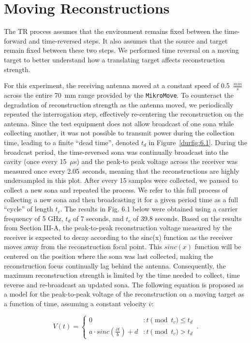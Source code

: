 \section{Moving Reconstructions}
\label{sec:moving}

The TR process assumes that the environment remains fixed between the time-forward and time-reversed steps. It also assumes that the source and target remain fixed between these two steps. We performed time reversal on a moving target to better understand how a translating target affects reconstruction strength.

For this experiment, the receiving antenna moved at a constant speed of 0.5~$\frac{mm}{s}$ across the entire 70~mm range provided by the \texttt{MikroMove}. To counteract the degradation of reconstruction strength as the antenna moved, we periodically repeated the interrogation step, effectively re-centering the reconstruction on the antenna. Since the test equipment does not allow broadcast of one sona while collecting another, it was not possible to transmit power during the collection time, leading to a finite ``dead time'', denoted $t_d$ in Figure~\ref{durfig:6.1}. During the broadcast period, the time-reversed sona was continually broadcast into the cavity (once every 15~$\mu$s) and the peak-to peak voltage across the receiver was measured once every 2.05~seconds, meaning that the reconstructions are highly undersampled in this plot. After every 15 samples were collected, we paused to collect a new sona and repeated the process. We refer to this full process of collecting a new sona and then broadcasting it for a given period time as a full ``cycle'' of length $t_c$. The results in Fig. 6.1 below were obtained using a carrier frequency of 5 GHz, $t_d$ of 7 seconds, and $t_c$ of 39.8 seconds. Based on the results from Section III-A, the peak-to-peak reconstruction voltage measured by the receiver is expected to decay according to the sinc(x) function as the receiver
moves away from the reconstruction focal point. This $sinc(x)$ function will be centered on the position where the sona was last collected, making the reconstruction focus continually lag behind the antenna. Consequently, the maximum reconstruction strength is limited by the time needed to collect, time reverse and re-broadcast an updated sona. The following equation is proposed as a model for the peak-to-peak voltage of the reconstruction on a moving target as a
function of time, assuming a constant velocity $\bar{v}$:

\begin{equation}\label{eq:vt}
  V(t) = \left\{
        \begin{array}{ll}
                0 & : t\pmod{t_c} \le t_d \\
                a\cdot sinc(\frac{\bar{v}t}{b})+d & : t\pmod{t_c} > t_d
        \end{array}\,.
  \right.
\end{equation}

